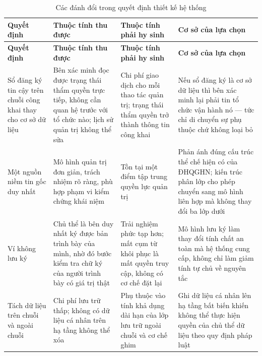 \begin{longtable}{|p{2.9cm}|p{3.6cm}|p{3.6cm}|p{3.8cm}|}

\caption{Các đánh đổi trong quyết định thiết kế hệ thống
\label{tab:design-tradeoff}} \\

\hline
\textbf{Quyết định} &
\textbf{Thuộc tính thu được} &
\textbf{Thuộc tính phải hy sinh} &
\textbf{Cơ sở của lựa chọn} \\
\hline
\endfirsthead

\hline
\textbf{Quyết định} &
\textbf{Thuộc tính thu được} &
\textbf{Thuộc tính phải hy sinh} &
\textbf{Cơ sở của lựa chọn} \\
\hline
\endhead

\hline
\endfoot

\hline
\endlastfoot

Sổ đăng ký tin cậy trên chuỗi công khai thay cho cơ sở dữ liệu
&
Bên xác minh đọc được trạng thái thẩm quyền trực tiếp, không cần quan hệ trước với tổ chức nào; lịch sử quản trị không thể sửa
&
Chi phí giao dịch cho mỗi thao tác quản trị; trạng thái thẩm quyền trở thành thông tin công khai
&
Nếu sổ đăng ký là cơ sở dữ liệu thì bên xác minh lại phải tin tổ chức vận hành nó --- tức chỉ di chuyển sự phụ thuộc chứ không loại bỏ
\\ \hline

Một nguồn niềm tin gốc duy nhất
&
Mô hình quản trị đơn giản, trách nhiệm rõ ràng, phù hợp phạm vi kiểm chứng khái niệm
&
Tồn tại một điểm tập trung quyền lực quản trị
&
Phản ánh đúng cấu trúc thể chế hiện có của ĐHQGHN; kiến trúc phân lớp cho phép chuyển sang mô hình liên hợp mà không thay đổi ba lớp dưới
\\ \hline

Ví không lưu ký
&
Chủ thể là bên duy nhất ký được bản trình bày của mình, nhờ đó bước kiểm tra chữ ký của người trình bày có giá trị thật
&
Trải nghiệm phức tạp hơn; mất cụm từ khôi phục là mất quyền truy cập, không có cơ chế đặt lại
&
Mô hình lưu ký làm thay đổi tính chất an toàn mà hệ thống cung cấp, không chỉ làm giảm tính tự chủ về nguyên tắc
\\ \hline

Tách dữ liệu trên chuỗi và ngoài chuỗi
&
Chi phí lưu trữ thấp; không có dữ liệu cá nhân trên hạ tầng không thể xóa
&
Phụ thuộc vào tính khả dụng dài hạn của lớp lưu trữ ngoài chuỗi và cơ chế ghim
&
Ghi dữ liệu cá nhân lên hạ tầng bất biến khiến không thể thực hiện quyền của chủ thể dữ liệu theo quy định pháp luật
\\ \hline


\end{longtable}

